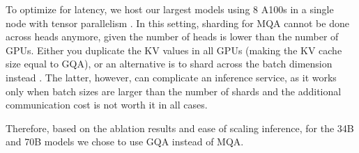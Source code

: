 \begin{table}[!htbp]
    \small
    \centering
    \setlength{\tabcolsep}{3pt} 
    \caption{
    \textbf{Attention architecture ablations.} We report 0-shot results for all tasks except MMLU(5-shot) and GSM8K(8-shot). For GSM8K and Human-Eval we report maj@1 and pass@1 results. For NQ and TriviaQA we report EM. For all other tasks we report accuracy.
    \label{tab:mqa_ablations}
    }
  \end{table}

To optimize for latency, we host our largest models using 8 A100s in a single node with tensor parallelism \citep{tp2019}.
In this setting, sharding for MQA cannot be done across heads anymore, given the number of heads is lower than the number of GPUs. Either you duplicate the KV values in all GPUs (making the KV cache size equal to GQA), or an alternative is to shard across the batch dimension instead \citep{palminf}. The latter, however, can complicate an inference service, as it works only when batch sizes are larger than the number of shards and the additional communication cost is not worth it in all cases.

Therefore, based on the ablation results and ease of scaling inference, for the 34B and 70B \cinnamon models we chose to use GQA instead of MQA. 


